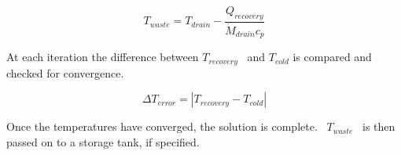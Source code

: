 \begin{equation}
{T_{waste}} = {T_{drain}} - \frac{{{Q_{recovery}}}}{{{{\dot M}_{drain}}{c_p}}}
\end{equation}

At each iteration the difference between \({T_{recovery}}\) ~and \({T_{cold}}\) is compared and checked for convergence.

\begin{equation}
\Delta {T_{error}} = \left| {{T_{recovery}} - {T_{cold}}} \right|
\end{equation}

Once the temperatures have converged, the solution is complete.~ \({T_{waste}}\) ~is then passed on to a storage tank, if specified.
